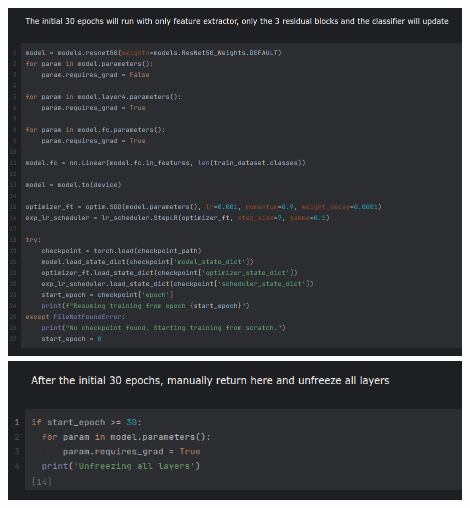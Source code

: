 \documentclass{cpsc202}
\begin{document}
\begin{enumerate}
        \includegraphics[width=0.9\textwidth]{change_layers_first} \\
        \includegraphics[width=0.9\textwidth]{change_layers_second}
    \end{enumerate}
\end{document}
